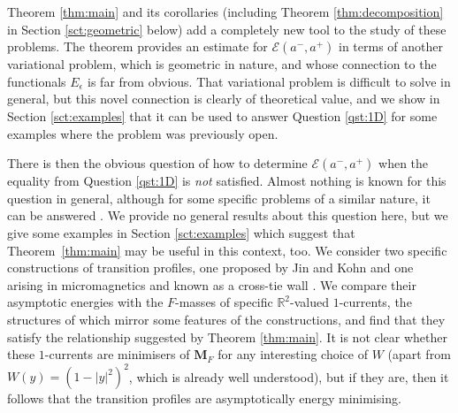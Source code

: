 \documentclass[a4paper]{article}
\newcommand{\R}{\mathbb{R}}
\newcommand{\M}{\mathbf{M}}
\theoremstyle{definition}
\theoremstyle{remark}
\begin{document}
Theorem \ref{thm:main} and its corollaries (including Theorem \ref{thm:decomposition} in Section \ref{sct:geometric}
below) add a completely new tool to the study of these problems. The theorem provides an estimate for $\mathcal{E}(a^-, a^+)$
in terms of another variational problem, which is geometric in nature, and whose connection to
the functionals $E_\epsilon$ is far from obvious. That variational problem is difficult to solve
in general, but this novel connection is clearly of theoretical value, and we show in
Section \ref{sct:examples} that it can be used to answer Question \ref{qst:1D} for some
examples where the problem was previously open.

There is then the obvious question of how to determine $\mathcal{E}(a^-, a^+)$ when the equality
from Question \ref{qst:1D} is \emph{not} satisfied. Almost nothing is known for this question in general,
although for some specific problems of a similar nature, it can be answered
\cite{Riviere-Serfaty:01, Riviere-Serfaty:03, Alouges-Riviere-Serfaty:02, Ignat-Moser:12}.
We provide no general results about this question here, but we give some examples in Section \ref{sct:examples}
which suggest that Theorem~\ref{thm:main} may be useful in this context, too.
We consider two specific constructions of transition profiles, one proposed by Jin and Kohn \cite{Jin-Kohn:00} and one arising in micromagnetics and known as a cross-tie wall \cite{DeSimone-Kohn-Mueller-Otto:03}. We compare their asymptotic energies
with the $F$-masses of specific $\R^2$-valued $1$-currents, the structures of
which mirror some features of the constructions, and find that they satisfy the
relationship suggested by Theorem \ref{thm:main}. It is not clear whether
these $1$-currents are minimisers of $\M_F$ for any interesting choice of $W$
(apart from $W(y) = (1 - |y|^2)^2$, which is already well understood),
but if they are, then it follows that the transition profiles are asymptotically
energy minimising.
\end{document}
